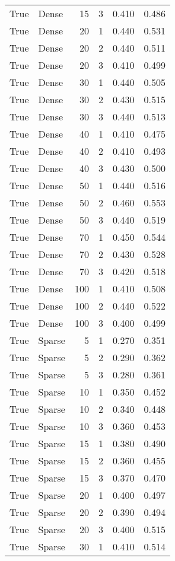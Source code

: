\begin{tabular}{rlrrrr}
True & Dense & 15 & 3 & 0.410 & 0.486 \\
True & Dense & 20 & 1 & 0.440 & 0.531 \\
True & Dense & 20 & 2 & 0.440 & 0.511 \\
True & Dense & 20 & 3 & 0.410 & 0.499 \\
True & Dense & 30 & 1 & 0.440 & 0.505 \\
True & Dense & 30 & 2 & 0.430 & 0.515 \\
True & Dense & 30 & 3 & 0.440 & 0.513 \\
True & Dense & 40 & 1 & 0.410 & 0.475 \\
True & Dense & 40 & 2 & 0.410 & 0.493 \\
True & Dense & 40 & 3 & 0.430 & 0.500 \\
True & Dense & 50 & 1 & 0.440 & 0.516 \\
True & Dense & 50 & 2 & 0.460 & 0.553 \\
True & Dense & 50 & 3 & 0.440 & 0.519 \\
True & Dense & 70 & 1 & 0.450 & 0.544 \\
True & Dense & 70 & 2 & 0.430 & 0.528 \\
True & Dense & 70 & 3 & 0.420 & 0.518 \\
True & Dense & 100 & 1 & 0.410 & 0.508 \\
True & Dense & 100 & 2 & 0.440 & 0.522 \\
True & Dense & 100 & 3 & 0.400 & 0.499 \\
True & Sparse & 5 & 1 & 0.270 & 0.351 \\
True & Sparse & 5 & 2 & 0.290 & 0.362 \\
True & Sparse & 5 & 3 & 0.280 & 0.361 \\
True & Sparse & 10 & 1 & 0.350 & 0.452 \\
True & Sparse & 10 & 2 & 0.340 & 0.448 \\
True & Sparse & 10 & 3 & 0.360 & 0.453 \\
True & Sparse & 15 & 1 & 0.380 & 0.490 \\
True & Sparse & 15 & 2 & 0.360 & 0.455 \\
True & Sparse & 15 & 3 & 0.370 & 0.470 \\
True & Sparse & 20 & 1 & 0.400 & 0.497 \\
True & Sparse & 20 & 2 & 0.390 & 0.494 \\
True & Sparse & 20 & 3 & 0.400 & 0.515 \\
True & Sparse & 30 & 1 & 0.410 & 0.514 \\

\end{tabular}
